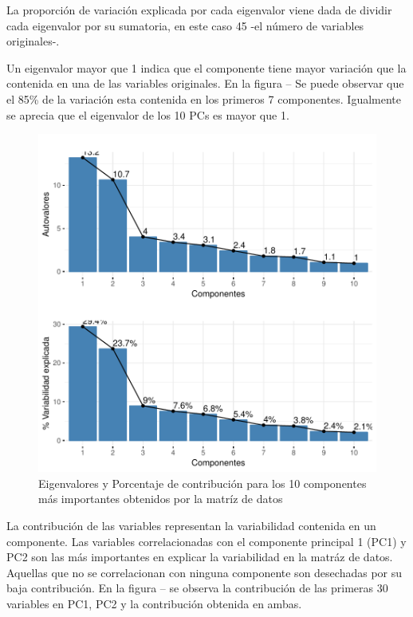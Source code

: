 \documentclass[a4paper,12pt]{Latex/Classes/PhDthesisPSnPDF}
\begin{document}
La proporción de variación explicada por cada eigenvalor viene dada de dividir cada eigenvalor por su sumatoria, en este caso 45 -el número de variables originales-.

Un eigenvalor mayor que 1 indica que el componente tiene mayor variación que la contenida en una de las variables originales. En la figura -- Se puede observar que el 85\% de la variación esta contenida en los primeros 7 componentes. Igualmente se aprecia que el eigenvalor de los 10 PCs es mayor que 1. 

\begin{figure}[H]
\centering
\includegraphics{main-013}
\caption{Eigenvalores y Porcentaje de contribución para los 10 componentes más importantes obtenidos por la matríz de datos}
\end{figure}

La contribución de las variables representan la variabilidad contenida en un componente. Las variables correlacionadas con el componente principal 1 (PC1) y PC2 son las más importantes en explicar la variabilidad en la matráz de datos. Aquellas que no se correlacionan con ninguna componente son desechadas por su baja contribución. En la figura -- se observa la contribución de las primeras 30 variables en PC1, PC2 y la contribución obtenida en ambas.
\end{document}
